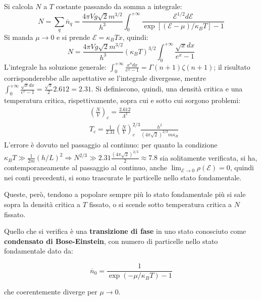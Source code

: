 \documentclass[10pt, a4paper]{scrartcl}
\numberwithin{equation}{subsection}
\theoremstyle{style1}
\theoremstyle{style2}
\newenvironment{boxenv}[1][]{
    \begin{eqbox}[#1]
    }{
   \end{eqbox}
}
\begin{document}
Si calcola $N$ a $T$ costante passando da somma a integrale:
\[
N = \sum_{q}^{} \overline{n}_q = \frac{4\pi V g \sqrt{2} m^{3 / 2} }{h^3}\int_{0} ^{+\infty} \frac{\mathscr{E}^{1 / 2} d\mathscr{E}}{\exp\left[ (\mathscr{E}-\mu ) / \kappa _B T \right] - 1}
\] 
Si manda $\mu \to 0$ e si prende $\mathscr{E} = \kappa _B T x$, quindi:
\[
N = \frac{4\pi V g \sqrt{2} m^{3 / 2} }{h^3} (\kappa _B T)^{3 / 2} \int_{0} ^{+\infty}  \frac{\sqrt{x} dx}{e^x - 1}
\] 
L'integrale ha soluzione generale: $\int_{0} ^{+\infty} \frac{x^n dx}{e^x - 1} = \Gamma(n+1) \zeta(n+1)$;
il risultato corrisponderebbe alle aspettative se l'integrale divergesse, mentre $\int_{0} ^{+\infty} \frac{\sqrt{x} dx}{e^x - 1} =\frac{\sqrt{\pi} }{2}2.612= 2.31$. 
Si definiscono, quindi, una densit\`a critica e una temperatura critica, rispettivamente, sopra cui e sotto cui sorgono problemi:
\begin{equation}
	\begin{split}
		& \left(\frac{N}{V}\right) _c = \frac{2.612}{\Lambda ^3}\\
		& T_c = \frac{1}{2.31} \left(\frac{N}{V}\right) _c^{2 / 3} \frac{h^2}{(4\pi \sqrt{2} )^{2/3} m\kappa _B }
	\end{split}
\end{equation}
L'errore \`e dovuto nel passaggio al continuo: per quanto la condizione $\kappa _B T \gg \frac{1}{2m} (h / L)^2\Rightarrow N^{2 / 3} \gg 2.31 \frac{(4\pi \sqrt{2} )^{2/3} }{2} \approx 7.8$ sia solitamente verificata, si ha, contemporaneamente al passaggio al continuo, anche $\lim_{\mathscr{E} \to 0} \rho (\mathscr{E}) =0$, quindi nei conti precedenti, si sono trascurate le particelle nello stato fondamentale.

Queste, per\`o, tendono a popolare sempre pi\`u lo stato fondamentale pi\`u si sale sopra la densit\`a critica a $T$ fissato, o si scende sotto temperatura critica a $N$ fissato.

Quello che si verifica \`e una \textbf{transizione di fase} in uno stato conosciuto come \textbf{condensato di Bose-Einstein}, con numero di particelle nello stato fondamentale dato da:
\begin{boxenv}[]
\begin{equation}
	\overline{n}_0 = \frac{1}{\exp(-\mu / \kappa _B T) - 1}
\end{equation}
\end{boxenv}
\noindent che coerentemente diverge per $\mu \to 0$.
\end{document}
